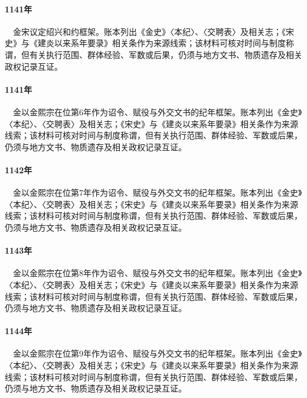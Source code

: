 \paragraph{1141年}　金宋议定绍兴和约框架。账本列出《金史》〈本纪〉、〈交聘表〉及相关志；《宋史》与《建炎以来系年要录》相关条作为来源线索；该材料可核对时间与制度称谓，但有关执行范围、群体经验、军数或后果，仍须与地方文书、物质遗存及相关政权记录互证。

\paragraph{1141年}　金以金熙宗在位第6年作为诏令、赋役与外交文书的纪年框架。账本列出《金史》〈本纪〉、〈交聘表〉及相关志；《宋史》与《建炎以来系年要录》相关条作为来源线索；该材料可核对时间与制度称谓，但有关执行范围、群体经验、军数或后果，仍须与地方文书、物质遗存及相关政权记录互证。

\paragraph{1142年}　金以金熙宗在位第7年作为诏令、赋役与外交文书的纪年框架。账本列出《金史》〈本纪〉、〈交聘表〉及相关志；《宋史》与《建炎以来系年要录》相关条作为来源线索；该材料可核对时间与制度称谓，但有关执行范围、群体经验、军数或后果，仍须与地方文书、物质遗存及相关政权记录互证。

\paragraph{1143年}　金以金熙宗在位第8年作为诏令、赋役与外交文书的纪年框架。账本列出《金史》〈本纪〉、〈交聘表〉及相关志；《宋史》与《建炎以来系年要录》相关条作为来源线索；该材料可核对时间与制度称谓，但有关执行范围、群体经验、军数或后果，仍须与地方文书、物质遗存及相关政权记录互证。

\paragraph{1144年}　金以金熙宗在位第9年作为诏令、赋役与外交文书的纪年框架。账本列出《金史》〈本纪〉、〈交聘表〉及相关志；《宋史》与《建炎以来系年要录》相关条作为来源线索；该材料可核对时间与制度称谓，但有关执行范围、群体经验、军数或后果，仍须与地方文书、物质遗存及相关政权记录互证。


